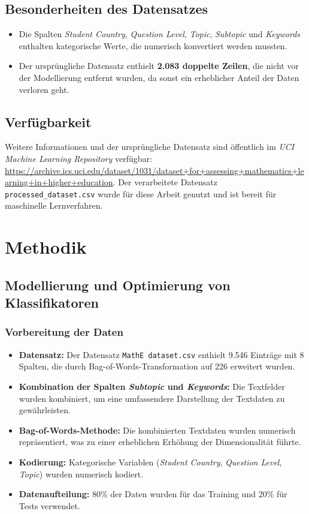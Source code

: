 \documentclass[a4paper,12pt]{article}
\begin{document}
\subsection{Besonderheiten des Datensatzes}
\begin{itemize}
    \item Die Spalten \textit{Student Country}, \textit{Question Level}, \textit{Topic}, \textit{Subtopic} und \textit{Keywords} enthalten kategorische Werte, die numerisch konvertiert werden mussten.
    \item Der ursprüngliche Datensatz enthielt \textbf{2.083 doppelte Zeilen}, die nicht vor der Modellierung entfernt wurden, da sonst ein erheblicher Anteil der Daten verloren geht.
\end{itemize}

\subsection{Verfügbarkeit}
Weitere Informationen und der ursprüngliche Datensatz sind öffentlich im \textit{UCI Machine Learning Repository} verfügbar:  
\url{https://archive.ics.uci.edu/dataset/1031/dataset+for+assessing+mathematics+learning+in+higher+education}.  
Der verarbeitete Datensatz \texttt{processed\_dataset.csv} wurde für diese Arbeit genutzt und ist bereit für maschinelle Lernverfahren.



\section{Methodik}

\subsection{Modellierung und Optimierung von Klassifikatoren}

\subsubsection{Vorbereitung der Daten}
\begin{itemize}
    \item \textbf{Datensatz:} Der Datensatz \texttt{MathE dataset.csv} enthielt 9.546 Einträge mit 8 Spalten, die durch Bag-of-Words-Transformation auf 226 erweitert wurden.
    \item \textbf{Kombination der Spalten \textit{Subtopic} und \textit{Keywords}:} Die Textfelder wurden kombiniert, um eine umfassendere Darstellung der Textdaten zu gewährleisten.
    \item \textbf{Bag-of-Words-Methode:} Die kombinierten Textdaten wurden numerisch repräsentiert, was zu einer erheblichen Erhöhung der Dimensionalität führte.
    \item \textbf{Kodierung:} Kategorische Variablen (\textit{Student Country}, \textit{Question Level}, \textit{Topic}) wurden numerisch kodiert.
    \item \textbf{Datenaufteilung:} 80\% der Daten wurden für das Training und 20\% für Tests verwendet.
\end{itemize}
\end{document}

